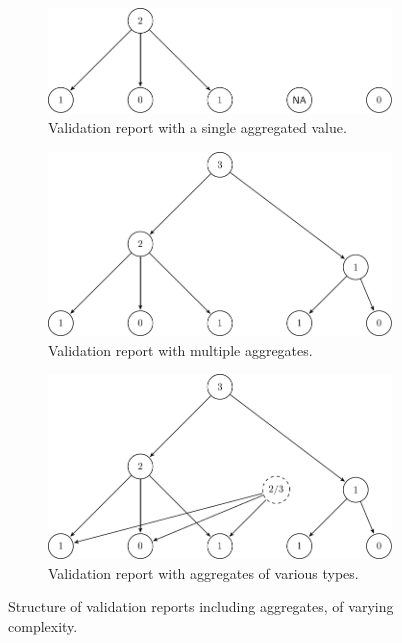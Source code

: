 \documentclass[a4paper, 11pt,titlepage]{article}
\begin{document}
\begin{figure}[!t]
  \centering
  \begin{subfigure}[b]{0.7\textwidth}
    \includegraphics[width=\textwidth]{fig/graph1.pdf}
    \caption{Validation report with a single aggregated value.}
    \label{fig:graph1}
  \end{subfigure}
  \begin{subfigure}[b]{0.7\textwidth}
    \includegraphics[width=\textwidth]{fig/graph2.pdf}
    \caption{Validation report with multiple aggregates.}
    \label{fig:graph2}
  \end{subfigure}
  \begin{subfigure}[b]{0.7\textwidth}
    \includegraphics[width=\textwidth]{fig/graph3.pdf}
    \caption{Validation report with aggregates of various types.}
    \label{fig:graph3}
  \end{subfigure}
  \caption{Structure of validation reports including aggregates, of varying complexity.}
  \label{fig:graphs}
\end{figure}
\end{document}
